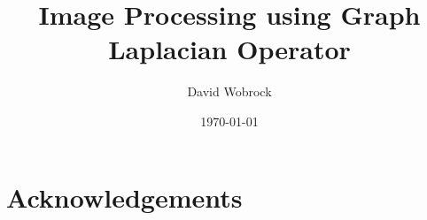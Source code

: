 \documentclass[]{kththesis}
\title{Image Processing using Graph Laplacian Operator}
\author{David Wobrock}
\date{\today}
\begin{document}
\frontmatter %

\titlepage

\begin{abstract}
 
\end{abstract}

\begin{otherlanguage}{swedish}
  \begin{abstract}
   
  \end{abstract}
\end{otherlanguage}

\begin{otherlanguage}{french}
  \begin{abstract}
   
  \end{abstract}
\end{otherlanguage}

\section*{Acknowledgements}


\tableofcontents

\mainmatter %









\clearpage
\printbibliography

%
%
\end{document}
